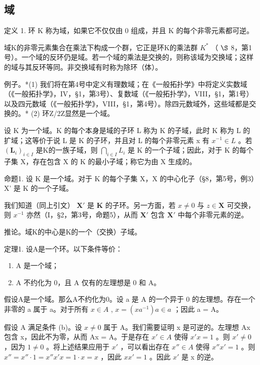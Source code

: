 \subsection{域}

定义 1. 环 K 称为域，如果它不仅仅由 0 组成，并且 K 的每个非零元素都可逆。

域K的非零元素集合在乘法下构成一个群，它正是环K的乘法群 \(K^{*}\) （ \(\S\) 8，第1号）。一个域的反环仍是域。若一个域的乘法是交换的，则称该域为交换域；这样的域与其反环等同。非交换域有时称为除环（体）。

例子。*(1) 我们将在第4号中定义有理数域；在《一般拓扑学》中将定义实数域（《一般拓扑学》，IV，§1，第3号）、复数域（《一般拓扑学》，VIII，§1，第1号）以及四元数域（《一般拓扑学》，VIII，§1，第4号）。除四元数域外，这些域都是交换的。* (2) 环Z/2Z显然是一个域。

设 K 为一个域。K 的每个本身是域的子环 L 称为 K 的子域，此时 K 称为 L 的扩域；这等价于说 L 是 K 的子环，并且对 L 的每个非零元素 x 有 \(x^{-1} \in L\) 。若 \((\mathbf{L}_{i})_{i \in I}\) 是K的一族子域，则 \(\bigcap_{i \in I} L_{i}\) 是 K 的一个子域；因此，对于 K 的每个子集 X，存在包含 X 的 K 的最小子域；称它为由 X 生成的。

命题1. 设 K 是一个域。对于 K 的每个子集 X，X 的中心化子（§8，第5号，例3）X' 是 K 的一个子域。

我们知道（同上引文） \(\mathbf{X}'\) 是 \(\mathbf{K}\) 的子环。另一方面，若 \(x \neq 0\) 与 \(z \in \mathbf{X}\) 可交换，则 \(x^{-1}\) 亦然（I，§2，第3号，命题5），从而 \(\mathbf{X}'\) 包含 \(\mathbf{X}'\) 中每个非零元素的逆。

推论。域K的中心是K的一个（交换）子域。

定理1. 设A是一个环。以下条件等价：

\begin{enumerate}
\def\labelenumi{(\alph{enumi})}
\item
  A 是一个域；
\item
  A 不约化为 0，且 A 仅有的左理想是 0 和 A。
\end{enumerate}

假设A是一个域。那么A不约化为0。设 a 是 A 的一个异于 0 的左理想。存在一个非零的 a 属于 a。对于所有 \(x \in A\) , \(x = (xa^{-1})a \in a\) ；因此 a = A。

假设 A 满足条件 (b)。设 \(x \neq 0\) 属于 A。我们需要证明 x 是可逆的。左理想 Ax 包含 x，因此不为零，从而 Ax = A。于是存在 \(x' \in A\) 使得 \(x'x = 1\) 。则 \(x' \neq 0\) ，因为 \(1 \neq 0\) 。将上述结果应用于 \(x'\) ，可以看出存在 \(x'' \in A\) 使得 \(x''x' = 1\) 。则 \(x'' = x'' \cdot 1 = x''x'x = 1 \cdot x = x\) ，因此 \(xx' = 1\) 。因此 \(x'\) 是 x 的逆。

